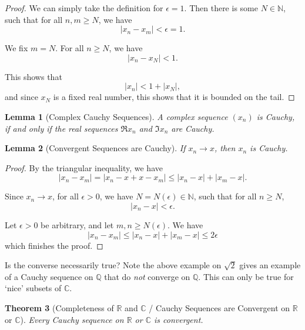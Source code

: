 \documentclass[11pt]{article}
\numberwithin{equation}{section}
\newtheorem{theorem}{Theorem}[section]
\newtheorem{lemma}[theorem]{Lemma}
\theoremstyle{definition}
\theoremstyle{remark}
\newcommand{\pqty}[1]{\left(#1\right)}
\newcommand{\abs}[1]{\left|#1\right|}
\newcommand{\RR}{\mathbb R}
\newcommand{\CC}{\mathbb C}
\newcommand{\NN}{\mathbb N}
\newcommand{\QQ}{\mathbb Q}
\begin{document}
\begin{proof}
    We can simply take the definition for \(\epsilon = 1\). Then there is some \(N \in \NN\), such that for all \(n, m \geq N\), we have
    \[
        \abs{x_n - x_m} < \epsilon = 1.
    \]

    We fix \(m = N\). For all \(n \geq N\), we have
    \[
        \abs{x_n - x_N} < 1.
    \]

    This shows that
    \[
        \abs{x_n} < 1 + \abs{x_N},
    \]
    and since \(x_N\) is a fixed real number, this shows that it is bounded on the tail.
\end{proof}

\begin{lemma}[Complex Cauchy Sequences]\label{analysis-unit-0025}
    \label{lem:seq-cauchy-complex-real}%
    A complex sequence \(\pqty{x_n}\) is Cauchy, if and only if the real sequences \(\Re x_n\) and \(\Im x_n\) are Cauchy.
\end{lemma}

\begin{lemma}[Convergent Sequences are Cauchy]\label{analysis-unit-0026}
    \label{lem:seq-convergent-implies-cauchy}%
    If \(x_n \to x\), then \(x_n\) is Cauchy.
\end{lemma}

\begin{proof}
    By the triangular inequality, we have
    \[
        \abs{x_n - x_m} = \abs{x_n - x + x - x_m} \leq \abs{x_n - x} + \abs{x_m - x}.
    \]

    Since \(x_n \to x\), for all \(\epsilon > 0\), we have \(N = N\pqty{\epsilon} \in \NN\), such that for all \(n \geq N\),
    \[
        \abs{x_n - x} < \epsilon.
    \]

    Let \(\epsilon > 0\) be arbitrary, and let \(m, n \geq N\pqty{\epsilon}\). We have
    \[
        \abs{x_n - x_m} \leq \abs{x_n - x} + \abs{x_m - x} \leq 2 \epsilon
    \]
    which finishes the proof.
\end{proof}

Is the converse necessarily true? Note the above example on \(\sqrt{2}\) gives an example of a Cauchy sequence on \(\QQ\) that do \emph{not} converge on \(\QQ\). This can only be true for `nice' subsets of \(\CC\).

\begin{theorem}[Completeness of \(\RR\) and \(\CC\) / Cauchy Sequences are Convergent on \(\RR\) or \(\CC\)]\label{analysis-unit-0027}
    \label{thm:completeness-of-r-and-c}%
    Every Cauchy sequence on \(\RR\) or \(\CC\) is convergent.
\end{theorem}
\end{document}
